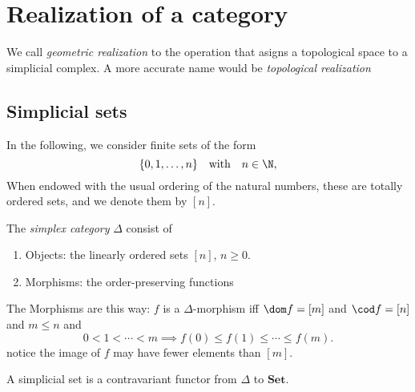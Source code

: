 \chapter{Realization of a category}

We call \textit{geometric realization} to the operation that asigns a topological space to a simplicial complex. A more accurate name would be \textit{topological realization}


\section{Simplicial sets}


In the following, we consider finite sets of the form \[\{0,1,\dots,n\}\quad\text{with}\quad n\in\N,\] 
When  endowed with the usual ordering of the natural numbers, these are totally ordered sets, and we denote them  by \([n]\). %


\begin{definition}
    The \textit{simplex category} \(\Delta\) consist of \begin{enumerate}[label=(\roman*)]
        \item Objects: the linearly ordered sets \([n]\), \(n\geq 0\).
        \item Morphisms: the order-preserving functions
    \end{enumerate}
\end{definition}

\begin{remark}
    The Morphisms are this way: \(f\) is a \(\Delta\)-morphism iff \(\dom f = [m]\)  and \(\cod f = [n]\) and \(m\leq n\) and \[
        0< 1 < \cdots < m \implies f(0) \leq f(1) \leq  \cdots \leq  f(m).
    \]
    notice the image of \(f\) may have fewer elements than \([m]\).
\end{remark}


\begin{definition}
    A simplicial set is a contravariant functor from \(\Delta\) to \(\mathbf{Set}\).
    
\end{definition}

